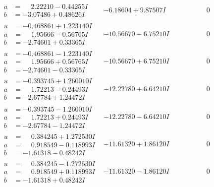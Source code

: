 \documentclass[1p]{elsarticle_modified}
\theoremstyle{definition}
\begin{document}
$$\begin{array}{c|c|c}
\begin{aligned}
a &= \phantom{-}2.22210 - 0.44255 I \\
b &= -3.07486 + 0.48626 I\end{aligned}
 & -6.18604 + 9.87507 I & \phantom{-0.000000 } 0 \\ \hline\begin{aligned}
u &= -0.468861 + 1.223140 I \\
a &= \phantom{-}1.95666 - 0.56765 I \\
b &= -2.74601 + 0.33365 I\end{aligned}
 & -10.56670 - 6.75210 I & \phantom{-0.000000 } 0 \\ \hline\begin{aligned}
u &= -0.468861 - 1.223140 I \\
a &= \phantom{-}1.95666 + 0.56765 I \\
b &= -2.74601 - 0.33365 I\end{aligned}
 & -10.56670 + 6.75210 I & \phantom{-0.000000 } 0 \\ \hline\begin{aligned}
u &= -0.393745 + 1.260010 I \\
a &= \phantom{-}1.72213 - 0.24493 I \\
b &= -2.67784 + 1.24472 I\end{aligned}
 & -12.22780 + 6.64210 I & \phantom{-0.000000 } 0 \\ \hline\begin{aligned}
u &= -0.393745 - 1.260010 I \\
a &= \phantom{-}1.72213 + 0.24493 I \\
b &= -2.67784 - 1.24472 I\end{aligned}
 & -12.22780 - 6.64210 I & \phantom{-0.000000 } 0 \\ \hline\begin{aligned}
u &= \phantom{-}0.384245 + 1.272530 I \\
a &= \phantom{-}0.918549 - 0.118993 I \\
b &= -1.61318 - 0.48242 I\end{aligned}
 & -11.61320 + 1.86120 I & \phantom{-0.000000 } 0 \\ \hline\begin{aligned}
u &= \phantom{-}0.384245 - 1.272530 I \\
a &= \phantom{-}0.918549 + 0.118993 I \\
b &= -1.61318 + 0.48242 I\end{aligned}
 & -11.61320 - 1.86120 I & \phantom{-0.000000 } 0 \\ \hline\begin{aligned}

\end{aligned}
\end{array}$$
\end{document}
